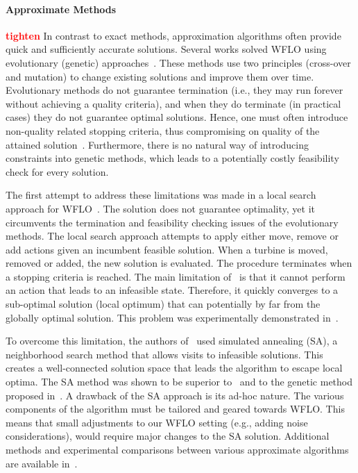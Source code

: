 \documentclass[preprint,12pt]{elsarticle}
\newcommand{\todo}[1]{{\textcolor{red}{\bf {#1}}}}
\begin{document}
\paragraph{Approximate Methods} \todo{tighten} In contrast to exact methods, approximation algorithms often provide   
quick and sufficiently accurate solutions. Several works solved 
WFLO using evolutionary (genetic) approaches~\cite{MOSETTI1994105,gonzalez2010optimization,grady2005placement}. 
These methods use two principles (cross-over and mutation)
to change existing solutions and improve them over time. Evolutionary methods do not guarantee termination 
(i.e., they may run forever without achieving a quality criteria), and when they do terminate (in practical cases) they do
not guarantee optimal solutions. Hence, one must often
introduce non-quality related stopping criteria, 
thus compromising on quality of the attained solution~\cite{davis1991handbook}.
Furthermore, there is no natural way of introducing constraints into genetic methods, which
leads to a potentially costly feasibility check for every solution. 

The first attempt to address these limitations 
was made in a local search approach for WFLO~\cite{ozturk2004heuristic}. 
The solution does not guarantee optimality, 
yet it circumvents the termination and feasibility checking issues of the evolutionary
methods. The local search approach attempts to apply either move, remove or add actions given an incumbent 
feasible solution. When a turbine is moved, removed or added, the new solution is evaluated. The procedure terminates 
when a stopping criteria is reached.
The main limitation of~\cite{ozturk2004heuristic} is that it cannot perform an action 
that leads to an infeasible state. Therefore, it quickly converges to a sub-optimal solution (local optimum) 
that can potentially by far
from the globally optimal solution. This problem was experimentally demonstrated in~\cite{rivas2009solving}. 

To overcome this limitation, the authors of~\cite{rivas2009solving} used simulated annealing (SA), 
a neighborhood search method that allows visits to infeasible solutions. 
This creates a well-connected solution space that leads the algorithm to escape 
local optima. The SA method was shown to be superior to~\cite{ozturk2004heuristic} 
and to the genetic method proposed in~\cite{grady2005placement}. A drawback of the SA approach 
is its ad-hoc nature. The various components of the algorithm
 must be tailored and geared towards WFLO. This means that small adjustments to our WFLO setting
 (e.g., adding noise considerations), would require major changes to the SA solution. 
Additional methods and experimental comparisons between various approximate algorithms are available in~\cite{samorani2013wind}.
\end{document}
